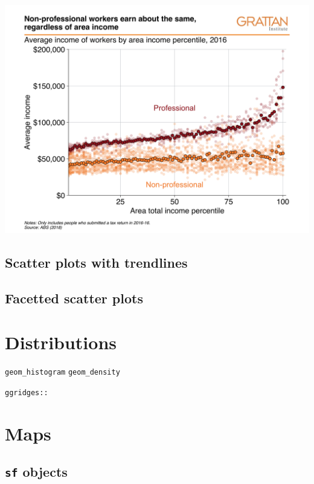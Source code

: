 \documentclass[]{book}
\begin{document}
\includegraphics[width=44.44in]{atlas/scatter_layer}

\hypertarget{scatter-plots-with-trendlines}{%
\subsection{Scatter plots with trendlines}\label{scatter-plots-with-trendlines}}

\hypertarget{facetted-scatter-plots}{%
\subsection{Facetted scatter plots}\label{facetted-scatter-plots}}

\hypertarget{distributions}{%
\section{Distributions}\label{distributions}}

\texttt{geom\_histogram}
\texttt{geom\_density}

\texttt{ggridges::}

\hypertarget{maps}{%
\section{Maps}\label{maps}}

\hypertarget{sf-objects}{%
\subsection{\texorpdfstring{\texttt{sf} objects}{sf objects}}\label{sf-objects}}
\end{document}
